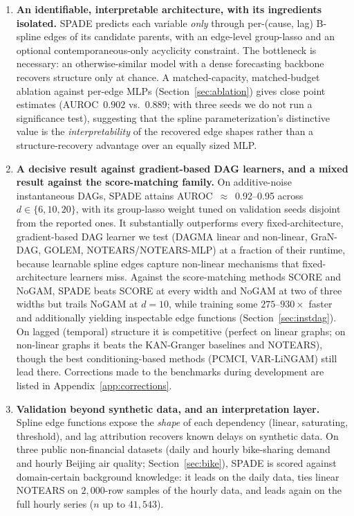 \begin{enumerate}
    \item \textbf{An identifiable, interpretable architecture, with its
    ingredients isolated.} SPADE predicts each variable \emph{only} through
    per-(cause, lag) B-spline edges of its candidate parents, with an edge-level
    group-lasso and an optional contemporaneous-only acyclicity constraint. The
    bottleneck is necessary: an otherwise-similar model with a dense forecasting
    backbone recovers structure only at chance. A matched-capacity,
    matched-budget ablation against per-edge MLPs
    (Section~\ref{sec:ablation}) gives close point estimates (AUROC~$0.902$ vs.\
    $0.889$; with three seeds we do not run a significance test), suggesting that
    the spline parameterization's distinctive value is the
    \emph{interpretability} of the recovered edge shapes rather than a
    structure-recovery advantage over an equally sized MLP.
    \item \textbf{A decisive result against gradient-based DAG learners, and a
    mixed result against the score-matching family.} On additive-noise
    instantaneous DAGs, SPADE attains AUROC~$\approx$~0.92--0.95 across
    $d\in\{6,10,20\}$, with its group-lasso weight tuned on validation seeds
    disjoint from the reported ones. It substantially outperforms every
    fixed-architecture, gradient-based DAG learner we test (DAGMA linear and
    non-linear, GraN-DAG, GOLEM, NOTEARS/NOTEARS-MLP) at a fraction of their
    runtime, because learnable spline edges capture non-linear mechanisms that
    fixed-architecture learners miss. Against the score-matching methods SCORE and
    NoGAM, SPADE beats SCORE at every width and NoGAM at two of three widths but
    trails NoGAM at $d{=}10$, while training some $275$--$930\times$ faster and
    additionally yielding inspectable edge functions
    (Section~\ref{sec:instdag}). On lagged (temporal) structure it is
    competitive (perfect on linear graphs; on non-linear graphs it beats the
    KAN-Granger baselines and NOTEARS), though the best conditioning-based
    methods (PCMCI, VAR-LiNGAM) still lead there. Corrections made to the
    benchmarks during development are listed in Appendix~\ref{app:corrections}.
    \item \textbf{Validation beyond synthetic data, and an interpretation
    layer.} Spline edge functions expose the \emph{shape} of each dependency
    (linear, saturating, threshold), and lag attribution recovers known delays on
    synthetic data. On three public non-financial datasets (daily and hourly bike-sharing demand and hourly Beijing air quality; Section~\ref{sec:bike}), SPADE is scored against domain-certain background knowledge: it leads on the daily data, ties linear NOTEARS on $2{,}000$-row samples of the hourly data, and leads again on the full hourly series ($n$ up to $41{,}543$).

\end{enumerate}
